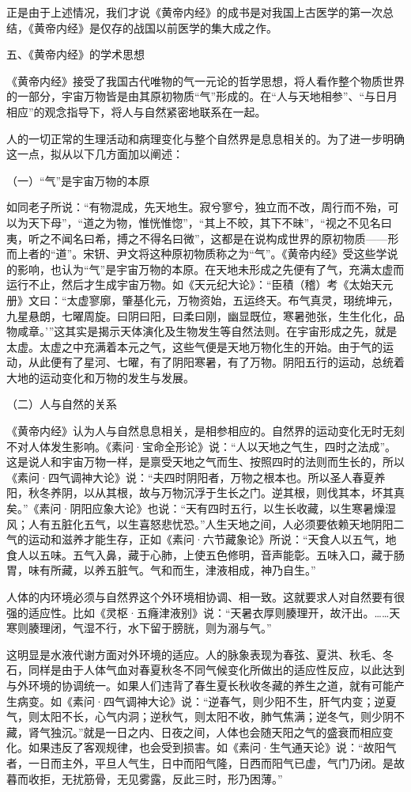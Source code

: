 \documentclass[a4paper,12pt,UTF8,twoside]{ctexbook}
\begin{document}
正是由于上述情况，我们才说《黄帝内经》的成书是对我国上古医学的第一次总结，《黄帝内经》是仅存的战国以前医学的集大成之作。

五、《黄帝内经》的学术思想

《黄帝内经》接受了我国古代唯物的气一元论的哲学思想，将人看作整个物质世界的一部分，宇宙万物皆是由其原初物质“气”形成的。在“人与天地相参”、“与日月相应”的观念指导下，将人与自然紧密地联系在一起。

人的一切正常的生理活动和病理变化与整个自然界是息息相关的。为了进一步明确这一点，拟从以下几方面加以阐述：

（一）“气”是宇宙万物的本原

如同老子所说：“有物混成，先天地生。寂兮寥兮，独立而不改，周行而不殆，可以为天下母”，“道之为物，惟恍惟惚”，“其上不皎，其下不昧”，“视之不见名曰夷，听之不闻名曰希，搏之不得名曰微”，这都是在说构成世界的原初物质——形而上者的“道”。宋钘、尹文将这种原初物质称之为“气”。《黄帝内经》受这些学说的影响，也认为“气”是宇宙万物的本原。在天地未形成之先便有了气，充满太虚而运行不止，然后才生成宇宙万物。如《天元纪大论》：“臣積（稽）考《太始天元册》文曰：“太虚寥廓，肇基化元，万物资始，五运终天。布气真灵，珝统坤元，九星悬朗，七曜周旋。曰阴曰阳，曰柔曰刚，幽显既位，寒暑弛张，生生化化，品物咸章。’”这其实是揭示天体演化及生物发生等自然法则。在宇宙形成之先，就是太虚。太虚之中充满着本元之气，这些气便是天地万物化生的开始。由于气的运动，从此便有了星河、七曜，有了阴阳寒暑，有了万物。阴阳五行的运动，总统着大地的运动变化和万物的发生与发展。

（二）人与自然的关系

《黄帝内经》认为人与自然息息相关，是相参相应的。自然界的运动变化无时无刻不对人体发生影响。《素问·宝命全形论》说：“人以天地之气生，四时之法成”。这是说人和宇宙万物一样，是禀受天地之气而生、按照四时的法则而生长的，所以《素问·四气调神大论》说：“夫四时阴阳者，万物之根本也。所以圣人春夏养阳，秋冬养阴，以从其根，故与万物沉浮于生长之门。逆其根，则伐其本，坏其真矣。”《素问·阴阳应象大论》也说：“天有四时五行，以生长收藏，以生寒暑燥湿风；人有五脏化五气，以生喜怒悲忧恐。”人生天地之间，人必须要依赖天地阴阳二气的运动和滋养才能生存，正如《素问·六节藏象论》所说：“天食人以五气，地食人以五味。五气入鼻，藏于心肺，上使五色修明，音声能彰。五味入口，藏于肠胃，味有所藏，以养五脏气。气和而生，津液相成，神乃自生。”

人体的内环境必须与自然界这个外环境相协调、相一致。这就要求人对自然要有很强的适应性。比如《灵枢·五癃津液别》说：“天暑衣厚则腠理开，故汗出。……天寒则腠理闭，气湿不行，水下留于膀胱，则为溺与气。”

这明显是水液代谢方面对外环境的适应。人的脉象表现为春弦、夏洪、秋毛、冬石，同样是由于人体气血对春夏秋冬不同气候变化所做出的适应性反应，以此达到与外环境的协调统一。如果人们违背了春生夏长秋收冬藏的养生之道，就有可能产生病变。如《素问·四气调神大论》说：“逆春气，则少阳不生，肝气内变；逆夏气，则太阳不长，心气内洞；逆秋气，则太阳不收，肺气焦满；逆冬气，则少阴不藏，肾气独沉。”就是一日之内、日夜之间，人体也会随天阳之气的盛衰而相应变化。如果违反了客观规律，也会受到损害。如《素问·生气通天论》说：“故阳气者，一日而主外，平旦人气生，日中而阳气隆，日西而阳气已虚，气门乃闭。是故暮而收拒，无扰筋骨，无见雾露，反此三时，形乃困薄。”
\end{document}
